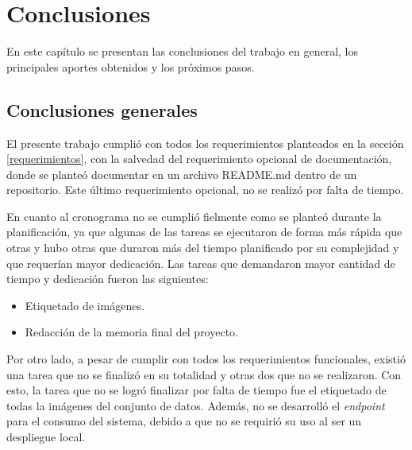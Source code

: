 
\chapter{Conclusiones} %

\label{Chapter5} %




En este capítulo se presentan las conclusiones del trabajo en general, los principales aportes obtenidos y los próximos pasos.

\section{Conclusiones generales }

El presente trabajo cumplió con todos los requerimientos planteados en la sección \ref{requerimientos}, con la salvedad del requerimiento opcional de documentación, donde se planteó documentar en un archivo README.md dentro de un repositorio. Este último requerimiento opcional, no se realizó por falta de tiempo.

En cuanto al cronograma no se cumplió fielmente como se planteó durante la planificación, ya que algunas de las tareas se ejecutaron de forma más rápida que otras y hubo otras que duraron más del tiempo planificado por su complejidad y que requerían mayor dedicación. Las tareas que demandaron mayor cantidad de tiempo y dedicación fueron las siguientes:

\begin{itemize}
\item Etiquetado de imágenes.
\item Redacción de la memoria final del proyecto. 
\end{itemize}

Por otro lado, a pesar de cumplir con todos los requerimientos funcionales, existió una tarea que no se finalizó en su totalidad y otras dos que no se realizaron. Con esto, la tarea que no se logró finalizar por falta de tiempo fue el etiquetado de todas la imágenes del conjunto de datos. Además, no se desarrolló  el \textit{endpoint} para el consumo del sistema, debido a que no se requirió su uso al ser un despliegue local.

